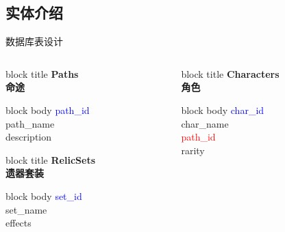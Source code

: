 \documentclass{beamer}
\begin{document}
\subsection{实体介绍}
\begin{frame}{数据库表设计}
    \begin{columns}[T]
        \begin{column}{0.25\textwidth}
            \begin{beamercolorbox}[rounded=true,shadow=true]{block title}
                \centering\textbf{Paths \\命途}
            \end{beamercolorbox}
            \begin{beamercolorbox}[rounded=true]{block body}
                \footnotesize
                \textcolor{blue}{path\_id} \\
                path\_name \\
                description \\
            \end{beamercolorbox}
            
            \vspace{0.85cm}
            
            \begin{beamercolorbox}[rounded=true,shadow=true]{block title}
                \centering\textbf{RelicSets \\遗器套装}
            \end{beamercolorbox}
            \begin{beamercolorbox}[rounded=true]{block body}
                \footnotesize
                \textcolor{blue}{set\_id} \\
                set\_name \\
                effects
            \end{beamercolorbox}
        \end{column}
        
        \begin{column}{0.25\textwidth}
            \begin{beamercolorbox}[rounded=true,shadow=true]{block title}
                \centering\textbf{Characters \\角色}
            \end{beamercolorbox}
            \begin{beamercolorbox}[rounded=true]{block body}
                \footnotesize
                \textcolor{blue}{char\_id} \\
                char\_name \\
                \textcolor{red}{path\_id} \\
                rarity
            \end{beamercolorbox}
            

\end{column}
\end{columns}
\end{frame}
\end{document}
